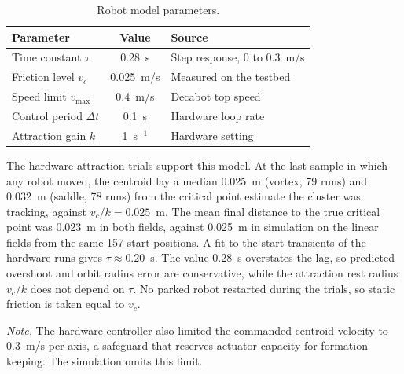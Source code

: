 \documentclass[journal]{IEEEtran}
\begin{document}
\begin{table}[!h]
\footnotesize
\centering
\caption{Robot model parameters.}
\label{tab:rm_params}
\setlength{\tabcolsep}{4pt}
\begin{tabular}{l c l}
\hline
\textbf{Parameter} & \textbf{Value} & \textbf{Source} \\
\hline
Time constant $\tau$ & 0.28~s & Step response, 0 to 0.3~m/s \\
Friction level $v_c$ & 0.025~m/s & Measured on the testbed \\
Speed limit $v_{\max}$ & 0.4~m/s & Decabot top speed \\
Control period $\Delta t$ & 0.1~s & Hardware loop rate \\
Attraction gain $k$ & 1~s$^{-1}$ & Hardware setting \\
\hline
\end{tabular}
\end{table}

The hardware attraction trials support this model. At the last sample in which any robot moved, the centroid lay a median 0.025~m (vortex, 79 runs) and 0.032~m (saddle, 78 runs) from the critical point estimate the cluster was tracking, against $v_c/k = 0.025$~m. The mean final distance to the true critical point was 0.023~m in both fields, against 0.025~m in simulation on the linear fields from the same 157 start positions. A fit to the start transients of the hardware runs gives $\tau \approx 0.20$~s. The value 0.28~s overstates the lag, so predicted overshoot and orbit radius error are conservative, while the attraction rest radius $v_c/k$ does not depend on $\tau$. No parked robot restarted during the trials, so static friction is taken equal to $v_c$.

\textit{Note.} The hardware controller also limited the commanded centroid velocity to 0.3~m/s per axis, a safeguard that reserves actuator capacity for formation keeping. The simulation omits this limit.
\end{document}
